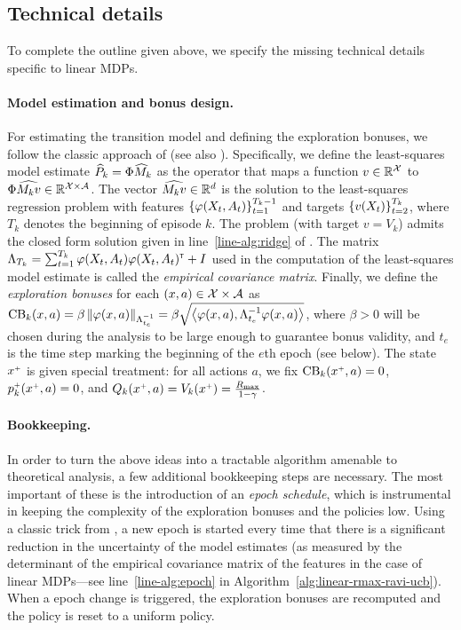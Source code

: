 \subsection{Technical details}

To complete the outline given above, we specify the missing technical details specific to linear MDPs.

\paragraph{Model estimation and bonus design.} For estimating the transition model and defining the exploration bonuses, we follow the classic approach of \citet{jin2019provably} (see also \citealp{Neu:2020}). Specifically, we define the least-squares model estimate $\widehat{P}_k = \Phi \widehat{M}_k$ as the operator that maps a function $v\in\mathbb{R}^{\mathcal{X}}$ to $\Phi \widehat{M_k v}\in \mathbb{R}^{\mathcal{X}\times\mathcal{A}}$. The vector $\widehat{M_k v}\in\mathbb{R}^d$ is the solution to the least-squares regression problem with features $\left\{{\varphi(X_t,A_t)}\right\}^{T_k - 1}_{t=1}$ and targets $\left\{{v(X_t)}\right\}^{T_k}_{t=2}$, where $T_k$ denotes the beginning of episode $k$. The problem (with target $v = V_k$) admits the closed form solution given in line~\ref{line-alg:ridge} of . The matrix $\Lambda_{T_k}= \sum^{T_k}_{t=1} \varphi(X_t,A_t)\varphi(X_t,A_t)^\mathsf{\scriptscriptstyle T} + I$ used in the computation of the least-squares model estimate is called the \emph{empirical covariance matrix}. Finally, we define the \emph{exploration bonuses} for each $(x,a)\in\mathcal{X}\times\mathcal{A}$ as $\operatorname{CB}_k(x,a) = \beta \left\|\varphi(x,a)\right\|_{\Lambda^{-1}_{t_e}} = \beta \sqrt{\bigl\langle\varphi(x,a),\Lambda^{-1}_{t_e}\varphi(x,a)\bigr\rangle}$, where $\beta>0$ will be chosen during the analysis to be large enough to guarantee bonus validity, and $t_e$ is the time step marking the beginning of the $e$th epoch (see below). The state $x^{\mathsf{\scriptscriptstyle +}}$ is given special treatment: for all actions $a$, we fix $\operatorname{CB}_k(x^{\mathsf{\scriptscriptstyle +}},a) = 0$, $p^{\mathsf{\scriptscriptstyle +}}_k(x^{\mathsf{\scriptscriptstyle +}},a) = 0$, and $Q_k(x^{\mathsf{\scriptscriptstyle +}},a) = V_k(x^{\mathsf{\scriptscriptstyle +}}) =\frac{R_{\max}}{1-\gamma}$.

\paragraph{Bookkeeping.} In order to turn the above ideas into a tractable algorithm amenable to theoretical analysis, a few additional bookkeeping steps are necessary. The most important of these is the introduction of an \emph{epoch schedule}, which is instrumental in keeping the complexity of the exploration bonuses and the policies low. Using a classic trick from \citet{APS11}, a new epoch is started every time that there is a significant reduction in the uncertainty of the model estimates (as measured by the determinant of the empirical covariance matrix of the features in the case of linear MDPs---see line~\ref{line-alg:epoch} in Algorithm~\ref{alg:linear-rmax-ravi-ucb}). When a epoch change is triggered, the exploration bonuses are recomputed and the policy is reset to a uniform policy.


